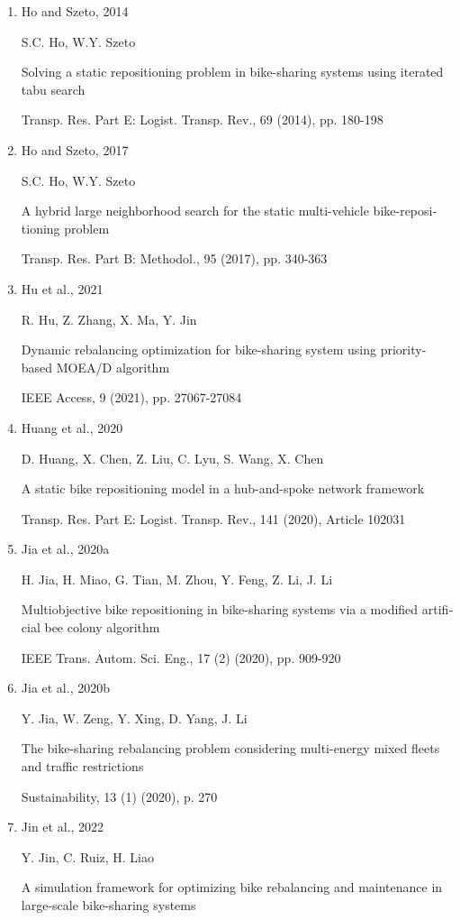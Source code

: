 \documentclass[
  english,
]{article}
\begin{document}
\begin{otherlanguage}{english}
\begin{enumerate}
  Gurobi Optimization, LLC, 2023. Gurobi optimizer reference manual. Available at:
  https://www.gurobi.com.
\item
  Ho and Szeto, 2014

  S.C. Ho, W.Y. Szeto

  Solving a static repositioning problem in bike-sharing systems using iterated tabu search

  Transp. Res. Part E: Logist. Transp. Rev., 69 (2014), pp. 180-198
\item
  Ho and Szeto, 2017

  S.C. Ho, W.Y. Szeto

  A hybrid large neighborhood search for the static multi-vehicle bike-repositioning problem

  Transp. Res. Part B: Methodol., 95 (2017), pp. 340-363
\item
  Hu et al., 2021

  R. Hu, Z. Zhang, X. Ma, Y. Jin

  Dynamic rebalancing optimization for bike-sharing system using priority-based MOEA/D algorithm

  IEEE Access, 9 (2021), pp. 27067-27084
\item
  Huang et al., 2020

  D. Huang, X. Chen, Z. Liu, C. Lyu, S. Wang, X. Chen

  A static bike repositioning model in a hub-and-spoke network framework

  Transp. Res. Part E: Logist. Transp. Rev., 141 (2020), Article 102031
\item
  Jia et al., 2020a

  H. Jia, H. Miao, G. Tian, M. Zhou, Y. Feng, Z. Li, J. Li

  Multiobjective bike repositioning in bike-sharing systems via a modified artificial bee colony
  algorithm

  IEEE Trans. Autom. Sci. Eng., 17 (2) (2020), pp. 909-920
\item
  Jia et al., 2020b

  Y. Jia, W. Zeng, Y. Xing, D. Yang, J. Li

  The bike-sharing rebalancing problem considering multi-energy mixed fleets and traffic
  restrictions

  Sustainability, 13 (1) (2020), p. 270
\item
  Jin et al., 2022

  Y. Jin, C. Ruiz, H. Liao

  A simulation framework for optimizing bike rebalancing and maintenance in large-scale bike-sharing
  systems


\end{enumerate}
\end{otherlanguage}
\end{document}
